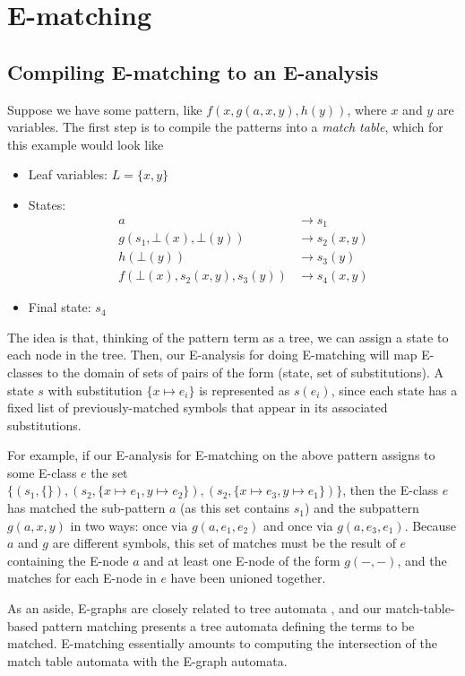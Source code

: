\documentclass[12pt,a4paper,twoside,openright]{report}
\numberwithin{equation}{chapter}		%
\numberwithin{figure}{chapter}			%
\numberwithin{table}{chapter}			%
\theoremstyle{definition}
\theoremstyle{plain}
\begin{document}
\section{E-matching}
\subsection{Compiling E-matching to an E-analysis} \label{ematchred}
Suppose we have some pattern, like $f(x, g(a, x, y), h(y))$, where $x$ and $y$ are variables. The first step is to compile the patterns into a \emph{match table}, which for this example would look like

\begin{itemize}
	\item Leaf variables: $L = \{x, y\}$
	\item States:
		\begin{align*}
			a &\rightarrow s_1 \\
			g(s_1, \bot(x), \bot(y)) &\rightarrow s_2(x, y) \\
			h(\bot(y)) &\rightarrow s_3(y) \\
			f(\bot(x), s_2(x, y), s_3(y)) &\rightarrow s_4(x,y)
		\end{align*}
	\item Final state: $s_4$
\end{itemize}

The idea is that, thinking of the pattern term as a tree, we can assign a state to each node in the tree. Then, our E-analysis for doing E-matching will map E-classes to the domain of sets of pairs of the form (state, set of substitutions). A state $s$ with substitution $\{x \mapsto e_i\}$ is represented as $s(e_i)$, since each state has a fixed list of previously-matched symbols that appear in its associated substitutions.

For example, if our E-analysis for E-matching on the above pattern assigns to some E-class $e$ the set $\{(s_1, \{\}), (s_2, \{x \mapsto e_1, y \mapsto e_2\}), (s_2, \{x \mapsto e_3, y \mapsto e_1\})\}$, then the E-class $e$ has matched the sub-pattern $a$ (as this set contains $s_1$) and the subpattern $g(a, x, y)$ in two ways: once via $g(a, e_1, e_2)$ and once via $g(a, e_3, e_1)$. Because $a$ and $g$ are different symbols, this set of matches must be the result of $e$ containing the E-node $a$ and at least one E-node of the form $g(-, -)$, and the matches for each E-node in $e$ have been unioned together.

As an aside, E-graphs are closely related to tree automata \cite{suciu_semantic_2025}, and our match-table-based pattern matching presents a tree automata defining the terms to be matched. E-matching essentially amounts to computing the intersection of the match table automata with the E-graph automata.
\end{document}
